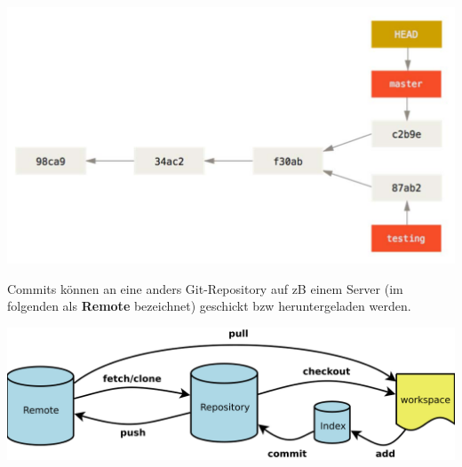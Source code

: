 \begin{center}
	\includegraphics[width=\columnwidth]{Images/branches}
\end{center}


Commits können an eine anders Git-Repository auf zB einem Server (im folgenden als \textbf{Remote} bezeichnet) geschickt bzw heruntergeladen werden.
\begin{center}
	\includegraphics[width=\columnwidth]{Images/remote}
\end{center}

